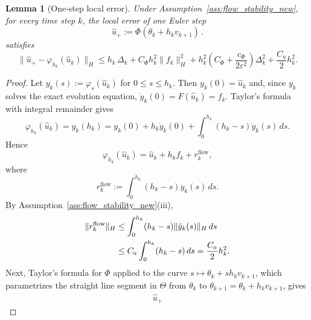 \documentclass[oneside,11pt]{article}
\newtheorem{lemma}{Lemma}
\theoremstyle{remark}
\theoremstyle{thmstyleone}
\theoremstyle{thmstylethree}
\theoremstyle{thmstyletwo}
\newcommand{\norm}[1]{\lVert #1\rVert}
\newcommand{\tc}[1]{#1}
\begin{document}
\begin{lemma}[One-step local error]
  \label{lem:local_error_new}
  Under Assumption~\ref{ass:flow_stability_new}, for every time step $k$,
  the local error of one Euler step
  \begin{equation}\label{eq:one_step_uplus}
    \hat{u}_+ := \Phi(\theta_k + h_kv_{k + 1})\,.
  \end{equation}
  satisfies
  \begin{equation}
    \norm{\hat u_+-\varphi_{h_k}(\hat u_k)}_H
    \le
    h_k\,\Delta_k
    +
    C_\Phi h_k^2\norm{f_k}_H^2
    +
    \tc{
    h_k^2
    \left(
    C_\Phi+\frac{c_\Phi}{2\varepsilon^2}
    \right)\Delta_k^2}
    +
    \frac{C_a}{2}h_k^2 .
    \label{eq:local_error_bound_new}
  \end{equation}
\end{lemma}
\begin{proof}
  Let $ y_k(s):=\varphi_s(\hat u_k)$ for $0\le s\le h_k$.
  Then $y_k(0)=\hat u_k$ and, since $y_k$ solves the exact evolution equation, $\dot y_k(0)=F(\hat u_k)=f_k$.
  Taylor's formula with integral remainder gives
  \begin{equation}
    \varphi_{h_k}(\hat u_k)
    =
    y_k(h_k)
    =
    y_k(0)+h_k\dot y_k(0)
    +
    \int_0^{h_k}(h_k-s)\ddot y_k(s)\,ds .
    \label{eq:flow_taylor_integral_new}
  \end{equation}
  Hence
  \begin{equation}
    \varphi_{h_k}(\hat u_k)
    =
    \hat u_k+h_k f_k+r_k^{\mathrm{flow}},
    \label{eq:flow_taylor_new}
  \end{equation}
  where
  \begin{equation}
    r_k^{\mathrm{flow}}
    :=
    \int_0^{h_k}(h_k-s)\ddot y_k(s)\,ds .
    \label{eq:flow_remainder_def_new}
  \end{equation}
  By Assumption~\ref{ass:flow_stability_new}\textnormal{(iii)},
  \begin{align}
    \norm{r_k^{\mathrm{flow}}}_H
     & \le
    \int_0^{h_k}(h_k-s)\norm{\ddot y_k(s)}_H\,ds
    \notag \\
     & \le
    C_a\int_0^{h_k}(h_k-s)\,ds
    =
    \frac{C_a}{2}h_k^2 .
    \label{eq:flow_remainder_bound_new}
  \end{align}
  Next, Taylor's formula for $\Phi$ applied to the curve $s \mapsto \theta_k + sh_k v_{k + 1}$, which parametrizes the straight line segment in $\Theta$ from $\theta_k$ to $\theta_{k + 1} = \theta_k + h_k v_{k + 1}$,  gives
  \begin{align}
    \hat u_+

\end{align}
\end{proof}
\end{document}
